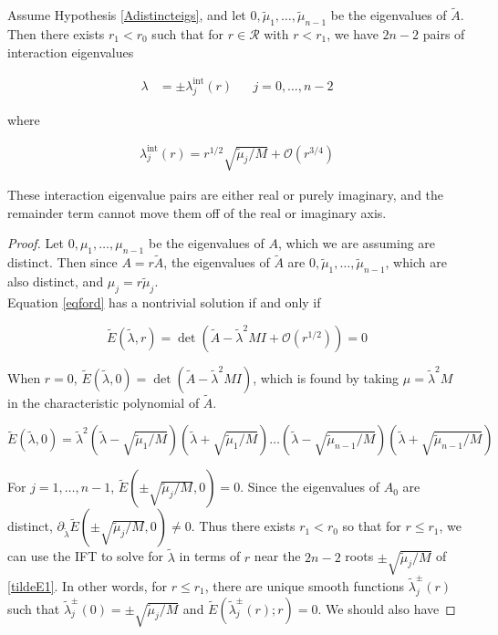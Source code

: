 \documentclass[thesis.tex]{subfiles}
\begin{document}

\begin{lemma}\label{inteigslemma}
Assume Hypothesis \ref{Adistincteigs}, and let $0, \tilde{\mu}_1, \dots, \tilde{\mu}_{n-1}$ be the eigenvalues of $\tilde{A}$. Then there exists $r_1 < r_0$ such that for $r \in \mathcal{R}$ with $r < r_1$, we have $2n - 2$ pairs of interaction eigenvalues

\begin{align*}
\lambda &= \pm \lambda^{\text{int}}_j(r) && j = 0, \dots, n-2
\end{align*}

where

\begin{align*}
\lambda^{\text{int}}_j(r) = r^{1/2} \sqrt{\tilde{\mu}_j / M} + \mathcal{O}(r^{3/4})
\end{align*}

These interaction eigenvalue pairs are either real or purely imaginary, and the remainder term cannot move them off of the real or imaginary axis.

\begin{proof}
Let $0, \mu_1, \dots, \mu_{n-1}$ be the eigenvalues of $A$, which we are assuming are distinct. Then since $A = r \tilde{A}$, the eigenvalues of $\tilde{A}$ are $0, \tilde{\mu}_1, \dots, \tilde{\mu}_{n-1}$, which are also distinct, and $\mu_j = r \tilde{\mu}_j$.\\

Equation \eqref{eqford} has a nontrivial solution if and only if

\[
\tilde{E}(\tilde{\lambda}, r) = \det
\left( \tilde{A} - \tilde{\lambda}^2 MI + \mathcal{O}(r^{1/2}) \right) = 0
\]

When $r = 0$, $\tilde{E}(\tilde{\lambda}, 0) = \det(\tilde{A} - \tilde{\lambda}^2 MI)$, which is found by taking $\mu = \tilde{\lambda}^2 M$ in the characteristic polynomial of $\tilde{A}$.

\begin{equation}\label{tildeE1}
\tilde{E}(\tilde{\lambda}, 0) = \tilde{\lambda}^2
\left( \tilde{\lambda} - \sqrt{\tilde{\mu}_1 / M} \right)
\left( \tilde{\lambda} + \sqrt{\tilde{\mu}_1 / M} \right) \dots
\left( \tilde{\lambda} - \sqrt{\tilde{\mu}_{n-1} / M} \right)
\left( \tilde{\lambda} + \sqrt{\tilde{\mu}_{n-1} / M} \right)
\end{equation}

For $j = 1, \dots, n-1$, $\tilde{E}(\pm \sqrt{\tilde{\mu}_j / M}, 0) = 0$. Since the eigenvalues of $A_0$ are distinct, $\partial_{\tilde{\lambda}} \tilde{E}(\pm \sqrt{\tilde{\mu}_j / M}, 0) \neq 0$. Thus there exists $r_1 < r_0$ so that for $r \leq r_1$, we can use the IFT to solve for $\tilde{\lambda}$ in terms of $r$ near the $2n-2$ roots $\pm \sqrt{\tilde{\mu}_j / M}$ of \eqref{tildeE1}. In other words, for $r \leq r_1$, there are unique smooth functions $\tilde{\lambda}_j^\pm(r)$ such that $\tilde{\lambda}_j^\pm(0) = \pm \sqrt{\tilde{\mu}_j / M}$ and $\tilde{E}(\tilde{\lambda}_j^\pm(r); r) = 0$. We should also have


\end{proof}
\end{lemma}
\end{document}
